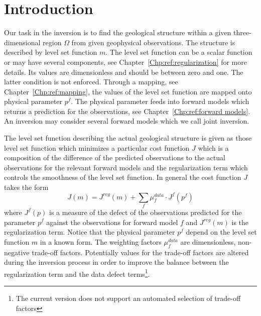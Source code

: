 \chapter{Introduction}\label{Chp:ref:introduction}
Our task in the inversion is to find the geological structure within a given three-dimensional region $\Omega$ from given geophysical 
observations. 
The structure is described by level set function $m$. The level set 
function can be a scalar function or may have several components, see Chapter~\ref{Chp:ref:regularization} for more details.
Its values are dimensionless and should be between zero and one. The latter condition is not enforced.    
Through a mapping, see Chapter~\ref{Chp:ref:mapping}, the values of the level set function are mapped
onto physical parameter $p^f$. The physical parameter feeds into forward models
which returns a prediction for the observations, see Chapter~\ref{Chp:ref:forward models}. An inversion may consider 
several forward models which we call joint inversion.


The level set function describing the actual geological structure is given as those level set function which minimizes
a particular cost function $J$ which is a composition of the 
difference of the predicted observations to the actual observations for the relevant forward models  
and the regularization term which controls the smoothness of the level set function. In general
the  cost function $J$ takes the form
\begin{equation}\label{REF:EQU:INTRO 1}
J(m) = J^{reg}(m) + \sum_{f} \mu^{data}_{f} \cdot J^{f}(p^f)
\end{equation} 
where $J^{f}(p)$ is a measure of the defect of the observations predicted for the parameter $p^f$ 
against the observations for forward model $f$ and $J^{reg}(m)$ is the regularization term.  Notice
that the physical parameter $p^f$ depend on the level set function $m$ in a known form.
The weighting factors $\mu^{data}_{f}$ are dimensionless, non-negative trade-off factors. Potentially
values for the trade-off factors are altered during the inversion process in order to improve the balance 
between the regularization term and the data defect terms\footnote{The current version does not support an automated selection 
of trade-off factors}.

